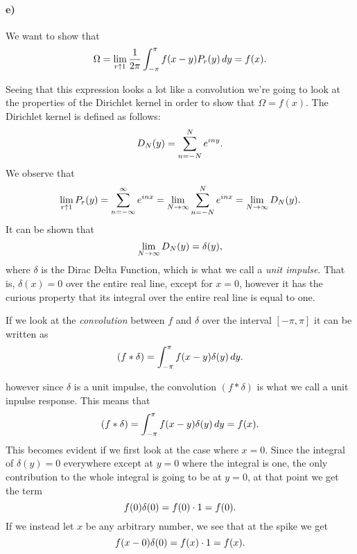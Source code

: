 \documentclass[a4paper]{article}
\begin{document}
\paragraph{e)}
  
We want to show that 
\begin{equation}
  \notag
  \Omega = \lim\limits_{r\uparrow 1} \frac{1}{2\pi}\int_{-\pi}^{\pi}f(x-y)P_r(y) \, dy = f(x).
\end{equation}

Seeing that this expression looks a lot like a convolution we're going to look
at the properties of the Dirichlet kernel in order to show that $\Omega =
f(x)$.  The Dirichlet kernel is defined as follows:
\begin{equation}
  \notag
  D_N(y) = \sum_{n=-N}^{N}e^{iny}.
\end{equation}
We observe that
\begin{equation}
  \notag
  \lim\limits_{r\uparrow 1}P_r(y) = \sum_{n = -\infty}^{\infty} e^{inx} = \lim\limits_{N \rightarrow \infty}\sum_{n=-N}^{N}e^{inx} = \lim\limits_{N \rightarrow \infty} D_N(y).
\end{equation}
It can be shown that
\begin{equation}
  \notag
  \lim\limits_{N \rightarrow \infty} D_N(y) = \delta(y),
\end{equation}
where $\delta$ is the Dirac Delta Function, which is what we call a
\textit{unit impulse}. That is, $\delta(x) = 0$ over the entire real line,
except for $x = 0$, however it has the curious property that its integral over
the entire real line is equal to one.

If we look at the \textit{convolution} between $f$ and $\delta$ over the
interval $\left[ -\pi, \pi \right]$ it can be written as
\begin{equation}
  \notag
  (f * \delta) = \int_{-\pi}^{\pi}f(x - y)\delta(y) \, dy.
\end{equation}

however since $\delta$ is a unit impulse, the convolution $(f * \delta)$ is
what we call a unit inpulse response.  This means that
\begin{equation}
  \notag
  (f * \delta) = \int_{-\pi}^{\pi}f(x - y)\delta(y) \, dy = f(x).
\end{equation}
This becomes evident if we first look at the case where $x = 0$.  Since the
integral of $\delta(y) = 0$ everywhere except at $y = 0$ where the integral is
one, the only contribution to the whole integral is going to be at $y = 0$, at
that point we get the term
\begin{equation}
  \notag
  f(0) \delta(0) = f(0) \cdot 1 = f(0).
\end{equation}
If we instead let $x$ be any arbitrary number, we see that at the spike we get
\begin{equation}
  \notag
  f(x - 0) \delta(0) = f(x) \cdot 1 = f(x).
\end{equation}
\end{document}
